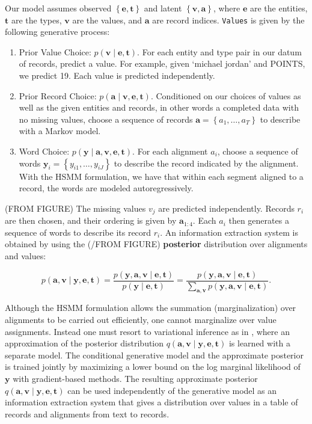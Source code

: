 \documentclass[12pt]{article}
\newcommand\set[1]{\left\{#1\right\}}
\newcommand{\ba}{\mathbf{a}}
\newcommand{\be}{\mathbf{e}}
\newcommand{\bt}{\mathbf{t}}
\newcommand{\bv}{\mathbf{v}}
\newcommand{\by}{\mathbf{y}}
\begin{document}
Our model assumes observed $\set{\be,\bt}$ and latent $\set{\bv,\ba}$, 
where $\be$ are the entities, $\bt$ are the types, $\bv$ are the values, and $\ba$ are
record indices.
\texttt{Values} is given by the following generative process:
\begin{enumerate}
\item Prior Value Choice: $p(\bv\mid\be,\bt)$.
For each entity and type pair in our datum of records, predict a value.
For example, given `michael jordan' and POINTS, we predict 19.
Each value is predicted independently.
\item Prior Record Choice: $p(\ba\mid\bv,\be,\bt)$.
Conditioned on our choices of values as well as the given entities and records,
in other words a completed data with no missing values,
choose a sequence of records $\ba = \set{a_1,\ldots,a_T}$ to describe with a Markov model.
\item Word Choice: $p(\by\mid\ba,\bv,\be,\bt)$.
For each alignment $a_i$,
choose a sequence of words $\by_i = \set{y_{i1},\ldots,y_{iJ}}$ to describe the record
indicated by the alignment.
With the HSMM formulation, we have that within each segment aligned to a record,
the words are modeled autoregressively.
\end{enumerate}
(FROM FIGURE)
The missing values $v_j$ are predicted independently.
Records $r_i$ are then chosen, and their ordering is given by $\ba_{1:4}$.
Each $a_i$ then generates a sequence of words to describe its record $r_i$.
An information extraction system is obtained by using the 
(/FROM FIGURE)
\textbf{posterior} distribution over alignments and values:
\begin{linenomath*}
$$
p(\ba,\bv\mid\by,\be,\bt)=\frac{p(\by,\ba,\bv\mid\be,\bt)}{p(\by\mid\be,\bt)}
=\frac{p(\by,\ba,\bv\mid\be,\bt)}{\sum_{\ba,\bv} p(\by,\ba,\bv\mid\be,\bt)}.
$$
\end{linenomath*}
Although the HSMM formulation allows the summation (marginalization) over alignments to be carried out efficiently,
one cannot marginalize over value assignments.
Instead one must resort to variational inference as in \citet{deng2018attn},
where an approximation of the posterior distribution $q(\ba,\bv\mid\by,\be,\bt)$
is learned with a separate model.
The conditional generative model and the approximate posterior is trained jointly 
by maximizing a lower bound on the log marginal likelihood of $\by$ with gradient-based methods.
The resulting approximate posterior $q(\ba,\bv\mid\by,\be,\bt)$ can be used independently of the 
generative model as an information extraction system that gives a distribution over
values in a table of records and alignments from text to records.
\end{document}
